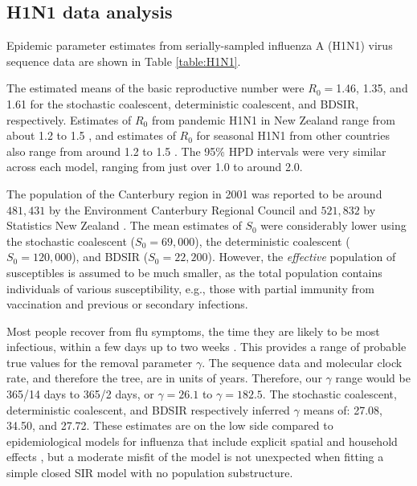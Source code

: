 \documentclass[12pt,titlepage]{article}
\newcommand{\BDSIR}{BDSIR}
\begin{document}
\subsection{H1N1 data analysis}

Epidemic parameter estimates from serially-sampled influenza A (H1N1) virus
sequence data are shown in Table \ref{table:H1N1}.  

The estimated means of the basic reproductive number were $R_{0}=$1.46, 1.35, and 1.61
for the stochastic coalescent, deterministic coalescent, and BDSIR, respectively.  
Estimates of $R_0$ from pandemic H1N1 in New Zealand range from about 1.2 to 1.5 
\citep{Paine:2010,RobertsandNishiura:2011,Opatowski:2011,Roberts:2013,Biggerstaff:2014}, and 
estimates of $R_0$ for seasonal H1N1 from other countries also range from around 1.2 to 1.5 \citep{Chowell:2008}.
The 95\% HPD intervals were very similar across each model, ranging from just over 1.0 to around 2.0.  

The population of the Canterbury region in 2001 was reported to be around $481,431$ by the
Environment Canterbury Regional Council \citep{ECAN} and $521,832$ by
Statistics New Zealand \citep{StatsNZ}. The mean estimates of $S_0$ were considerably lower using the stochastic coalescent ($S_{0}=69,000$), 
the deterministic coalescent ($S_{0}=120,000$), and BDSIR ($S_{0}=22,200$).  However, the \textit{effective} population of susceptibles 
is assumed to be much smaller, as the total population contains individuals of various susceptibility, e.g., those with partial immunity from vaccination and previous or secondary infections.  

Most people recover from flu symptoms, the time they are likely to be most infectious, within a few days up to two weeks \citep{CDC,WHO}.  
This provides a range of probable true values for the removal parameter $\gamma$.  The sequence data and molecular clock rate, and therefore 
the tree, are in units of years.  Therefore, our $\gamma$ range would be 365/14 days to 365/2 days, or $\gamma=26.1$ 
to $\gamma=182.5$.  The stochastic coalescent, deterministic coalescent, and \BDSIR{} respectively inferred $\gamma$ means of:  27.08, 34.50, and 27.72.  
These estimates are on the low side compared to epidemiological models for influenza that include explicit spatial and household effects \citep{Ferguson:2005}, 
but a moderate misfit of the model is not unexpected when fitting a simple closed SIR model with no population substructure.
\end{document}

